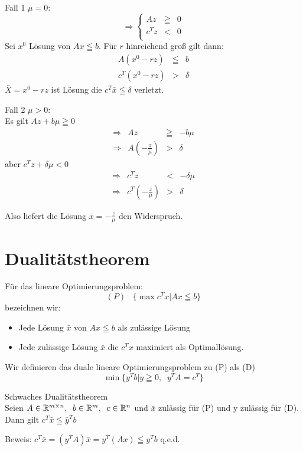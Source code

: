 Fall 1 $\mu =0$:
\[\Rightarrow \left\{ \begin{array}{rcl}
A z &\geqq & 0\\
c^{T}z&<&0\\
\end{array}\right.\]
Sei $x^{0}$ Lösung von $A x\leqq b$. Für $r$ hinreichend groß gilt dann:
\[\begin{array}{rcl}A(x^{0} -r z) &\leqq& b\\
c^{T}(x^{0}-r z)&>&\delta\end{array}\]
$\bar{X}=x^{0} -r z$ ist Lösung die $c^{T}\bar{x} \leqq \delta$ verletzt.

Fall 2 $\mu > 0$:\\
Es gilt $A z + b \mu \geqq 0$
\[\begin{array}{crcl}
\Rightarrow & A z &\geqq & -b \mu\\
\Rightarrow & A\left(-\frac{z}{\mu} \right)&>& \delta
\end{array}\]
aber $c^{T}z + \delta\mu < 0$
\[\begin{array}{crcl}
\Rightarrow & c^{T}z &<& - \delta \mu \\
\Rightarrow & c^{T}\left(-\frac{z}{\mu}\right) &>& \delta
\end{array}\]

Also liefert die Lösung $\bar{x}=-\frac{z}{\mu}$ den Widerspruch.

\section{Dualitätstheorem}

Für das lineare Optimierungsproblem:
\[(P) \; \; \; \{\max c^{T}x | A x \leqq b\}\]
bezeichnen wir:
\begin{itemize} 
\item Jede Lösung $\bar{x}$ von $A x \leqq b$ als zulässige Lösung
\item Jede zulässige Lösung $\bar{x}$ die $c^{T} x $ maximiert als
Optimallösung.
\end{itemize}
Wir definieren das duale lineare Optimierungsproblem zu (P)
als (D) \[\min \{y^{T}b| y \geqq 0 , \; \; y^{T}A = c^{T} \}\]

\begin{satz} \label{SchwQual} Schwaches Dualitätstheorem\\
Seien $A \in \mathbb{R}^{m \times n}, \; \; b \in \mathbb{R}^{m}, \;\; c \in \mathbb{R}^{n}$ und
$\bar{x}$ zulässig  für (P) und y zulässig für (D). Dann gilt $c^{T}\bar{x}
\leqq \bar{y}^{T} b$
\end{satz}
Beweis: $c^ {T}\bar{x} = (y^{T}A) \bar{x} = y^{T}(A x) \leqq y^{T}b$ q.e.d.

